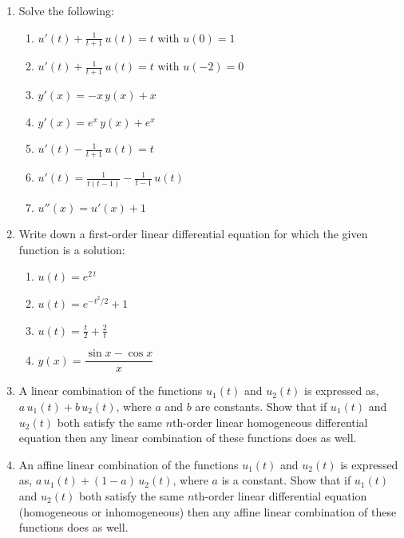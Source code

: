 \documentclass[11pt]{article}
\begin{document}
\begin{enumerate}
\begin{enumerate}
\begin{enumerate}
          \item $y'(x) = -x\, y(x)$
          \item $y'(x) = x \, y(x) - x$
          \item $y'(x) = e^x\, y(x) + e^x$.
          \item Under what conditions can we view a first-order linear differential equation as separable?
          \item Use a computer to create sketches of the solutions to parts (a) to (e).
        \end{enumerate}
      \item Solve the following:
        \begin{enumerate}
          \item $u'(t) + \frac{1}{t+1}\, u(t) = t$ with $u(0)=1$
          \item $u'(t) + \frac{1}{t+1}\, u(t) = t$ with $u(-2) = 0$
          \item $y'(x) = -x\, y(x) + x$
          \item $y'(x) = e^x\, y(x) + e^x$
          \item $u'(t) - \frac{1}{t+1}\, u(t) = t$
          \item $u'(t) = \frac{1}{t(t-1)} - \frac{1}{t-1}\, u(t)$
          \item $u''(x) = u'(x) + 1$
        \end{enumerate}			 
      \item Write down a first-order linear differential equation for which the given function is a solution:
        \begin{enumerate}
          \item $u(t) = e^{2\, t}$
          \item $u(t) = e^{-t^2/2} + 1$
          \item $u(t) = \frac{t}{2} + \frac{2}{t}$
          \item $y(x) = \dfrac{\sin x - \cos x}{x}$ 
        \end{enumerate}
      \item A linear combination of the functions $u_1(t)$ and $u_2(t)$ is expressed as, $a\, u_1(t) + b\, u_2(t)$, where $a$ and $b$ are constants. Show that if $u_1(t)$ and $u_2(t)$  both satisfy the same $n$th-order linear homogeneous differential equation then any linear combination of these functions does as well.
      \item An affine linear combination of the functions $u_1(t)$ and $u_2(t)$ is expressed as, $a\, u_1(t) + (1-a)\, u_2(t)$, where $a$ is a constant. Show that if $u_1(t)$ and $u_2(t)$  both satisfy the same $n$th-order linear  differential equation (homogeneous or inhomogeneous) then any affine linear combination of these functions does as well. 

\end{enumerate}
\end{enumerate}
\end{document}
